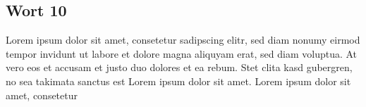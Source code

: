 \documentclass[10pt,a4paper]{article} %
\begin{document}
\begin{multicols}{2}
\subsection*{Wort 10}
Lorem ipsum dolor sit amet, consetetur sadipscing elitr, sed diam nonumy eirmod tempor invidunt ut labore et dolore magna aliquyam erat, sed diam voluptua. At vero eos et accusam et justo duo dolores et ea rebum. Stet clita kasd gubergren, no sea takimata sanctus est Lorem ipsum dolor sit amet. Lorem ipsum dolor sit amet, consetetur 

\end{multicols}
\end{document}
